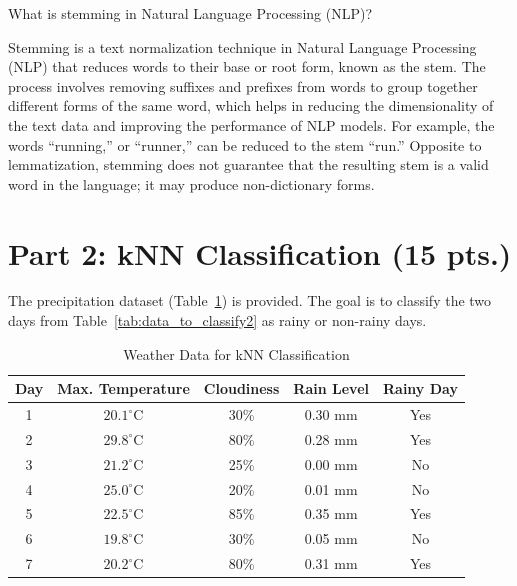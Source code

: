 \documentclass[12pt]{article}
\begin{document}
    \begin{ejercicio}[Stemming (1 pt.)]
        What is stemming in Natural Language Processing (NLP)?

        Stemming is a text normalization technique in Natural Language Processing (NLP) that reduces words to their base or root form, known as the stem. The process involves removing suffixes and prefixes from words to group together different forms of the same word, which helps in reducing the dimensionality of the text data and improving the performance of NLP models. For example, the words ``running,'' or ``runner,'' can be reduced to the stem ``run.'' Opposite to lemmatization, stemming does not guarantee that the resulting stem is a valid word in the language; it may produce non-dictionary forms.
    \end{ejercicio}

    \newpage


    \section*{Part 2: kNN Classification (15 pts.)}

    The precipitation dataset (Table~\ref{tab:weather_data2}) is provided. The goal is to classify the two days from Table~\ref{tab:data_to_classify2} as rainy or non-rainy days.

    \begin{table}[h!]
    \centering
    \begin{tabular}{|c|c|c|c|c|}
    \hline
    \textbf{Day} & \textbf{Max. Temperature} & \textbf{Cloudiness} & \textbf{Rain Level} & \textbf{Rainy Day} \\ \hline
    1 & $20.1^{\circ}\text{C}$ & 30\% & 0.30 mm & Yes \\ \hline
    2 & $29.8^{\circ}\text{C}$ & 80\% & 0.28 mm & Yes \\ \hline
    3 & $21.2^{\circ}\text{C}$ & 25\% & 0.00 mm & No \\ \hline
    4 & $25.0^{\circ}\text{C}$ & 20\% & 0.01 mm & No \\ \hline
    5 & $22.5^{\circ}\text{C}$ & 85\% & 0.35 mm & Yes \\ \hline
    6 & $19.8^{\circ}\text{C}$ & 30\% & 0.05 mm & No \\ \hline
    7 & $20.2^{\circ}\text{C}$ & 80\% & 0.31 mm & Yes \\ \hline
    \end{tabular}
    \caption{Weather Data for kNN Classification}
    \label{tab:weather_data2}
    \end{table}
\end{document}
